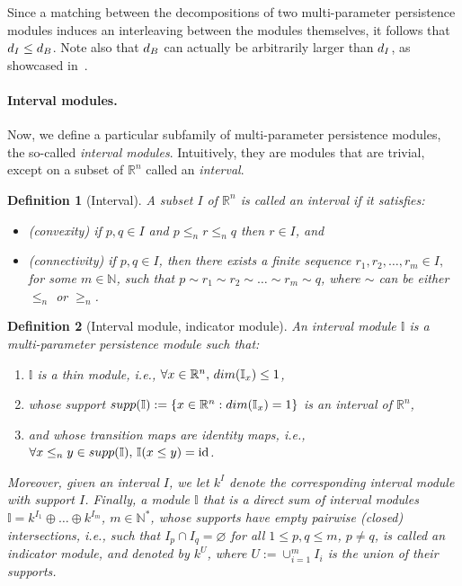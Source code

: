 \documentclass{article}
\newcommand{\field}{k}
\newcommand{\R}{\mathbb{R}}
\newcommand{\Rbb}{\mathbb{R}}
\newcommand{\Ibb}{\mathbb{I}}
\newcommand{\N}{\mathbb{N}}
\newcommand{\disti}{{d_{\rm I}}}
\newcommand{\distb}{{d_{\rm B}}}
\newcommand{\leqn}{\leq_n}
\newcommand{\geqn}{\geq_n}
\newcommand{\supp}[1]{ {\rm supp}(#1) }
\newcommand{\dimension}[1]{ {\rm dim}(#1) }
\newtheorem{definition}{Definition}%
\newcommand{\rebuttal}[1]{{ #1}}
\begin{document}
Since a matching between the decompositions of two multi-parameter persistence modules induces an interleaving between
the modules themselves, it follows that $\disti\leq\distb$.
Note also that $\distb$ can actually be arbitrarily larger than $\disti$, as showcased in~\cite[Section 9]{botnanAlgebraicStabilityZigzag2018}.

\paragraph*{Interval modules.} %
\rebuttal{Now, we define a particular subfamily of multi-parameter persistence modules, the so-called {\em interval modules}.} Intuitively, they are modules that are trivial,
except on a subset of $\R^n$ called an {\em interval}. \\

\begin{definition}[Interval] \label{def:poset_interval}
	A subset $I$ of $\R^n$ is called an \emph{interval} %
	if it satisfies: %
	\begin{itemize}
		\item {\em (convexity)} if $p,q\in I$ and $p\leqn r \leqn q$ then $r\in I$, and
		\item {\em (connectivity)} if $p,q \in I$, then there exists a finite sequence $r_1,r_2,\dots,r_m \in I,$ for some $ m\in \N$,
			such that $p \sim r_1 \sim r_2 \sim \dots \sim r_m \sim q$, where $\sim$ can be either $\leqn$ or $\geqn$. \\
	\end{itemize}
\end{definition}


\begin{definition}[Interval module, indicator module]\label{def:interval_module_multi}
	An {\em interval module} $\Ibb$ is a multi-parameter persistence module such that:
	\begin{enumerate}
		\item $\Ibb$ is a thin module, i.e., $\forall  x \in \R^n, \, \dimension{\Ibb_x} \leq 1$,
		\item whose support $\supp{\Ibb} := \{x \in \R^n : \dimension{\Ibb_x} = 1\}$ is an interval of $\Rbb^n$,
		\item and whose transition maps are identity maps, i.e., $ \forall x\le_n y \in \supp{\Ibb}, \, \Ibb(x\le y) = \mathrm{id}$.
	\end{enumerate}

	Moreover, given an interval $I$, we let $\field^I$ denote the corresponding interval module with support $I$.
	Finally, a module $\Ibb$ that is a direct sum of interval modules $\Ibb =
	k^{I_1}\oplus\dots\oplus k^{I_m}$, $m\in\N^*$, whose supports have empty
	pairwise (closed) intersections, i.e., such that $I_p\cap I_q = \varnothing$ for all $1\leq p,q \leq m$, $p\neq q$, is called an \emph{indicator module}, and denoted by $k^U$,
	where $U:=\cup_{i=1}^m I_i$ is the union of their supports.\\
\end{definition}
\end{document}
